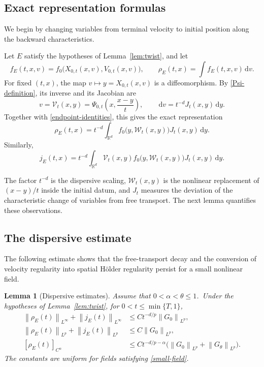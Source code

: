 \documentclass[11pt]{article}
\newtheorem{lemma}[theorem]{Lemma}
\newcommand{\R}{\mathbb R}
\newcommand{\norm}[1]{\left\lVert #1\right\rVert}
\newcommand{\dd}{\,\mathrm d}
\begin{document}
\subsection{Exact representation formulas}

We begin by changing variables from terminal velocity to initial position
along the backward characteristics.

Let $E$ satisfy the hypotheses of Lemma~\ref{lem:twist}, and let
\begin{equation}\label{transported-f}
 f_E(t,x,v)=f_0\bigl(X_{0,t}(x,v),V_{0,t}(x,v)\bigr),
 \qquad
 \rho_E(t,x)=\int f_E(t,x,v)\dd v.
\end{equation}
For fixed $(t,x)$, the map $v\mapsto y=X_{0,t}(x,v)$ is a diffeomorphism.
By \eqref{Psi-definition}, its inverse and its Jacobian are
\begin{equation*}
 v=\mathcal V_t(x,y)
   =\Psi_{0,t}\left(x,\frac{x-y}{t}\right),
 \qquad
 \dd v=t^{-d}J_t(x,y)\dd y.
\end{equation*}
Together with \eqref{endpoint-identities}, this gives the exact representation
\begin{equation}\label{densityrepresentation}
 \rho_E(t,x)=t^{-d}\int_{\R^d}
 f_0\bigl(y,\mathcal W_t(x,y)\bigr)J_t(x,y)\dd y.
\end{equation}
Similarly,
\begin{equation}\label{currentrepresentation}
 j_E(t,x)=t^{-d}\int_{\R^d}
 \mathcal V_t(x,y)f_0\bigl(y,\mathcal W_t(x,y)\bigr)
 J_t(x,y)\dd y.
\end{equation}

The factor $t^{-d}$ is the dispersive scaling, $\mathcal W_t(x,y)$ is the
nonlinear replacement of $(x-y)/t$ inside the initial datum, and $J_t$
measures the deviation of the characteristic change of variables from free
transport.  The next lemma quantifies these observations.

\subsection{The dispersive estimate}

The following estimate shows that the free-transport decay and the conversion
of velocity regularity into spatial H\"older regularity persist for a small
nonlinear field.

\begin{lemma}[Dispersive estimates]\label{lem:mixing}
Assume that $0<\alpha<\theta\leq1$.\
Under the hypotheses of Lemma~\ref{lem:twist}, for $0<t\leq\min\{T,1\}$,
 \begin{align}
 \norm{\rho_E(t)}_{L^\infty}+\norm{j_E(t)}_{L^\infty}
 &\leq Ct^{-d/p}\norm{G_0}_{L^p},\label{mix-Linfty}\\
 \norm{\rho_E(t)}_{L^p}+\norm{j_E(t)}_{L^p}
 &\leq C\norm{G_0}_{L^p},\label{mix-Lp}\\
 [\rho_E(t)]_{C^\alpha}
 &\leq Ct^{-d/p-\alpha}
       \big(\norm{G_0}_{L^p}+\norm{G_\theta}_{L^p}\big).
       \label{mix-Calpha}
\end{align} 
The constants are uniform for fields satisfying \eqref{small-field}.
\end{lemma}
\end{document}
